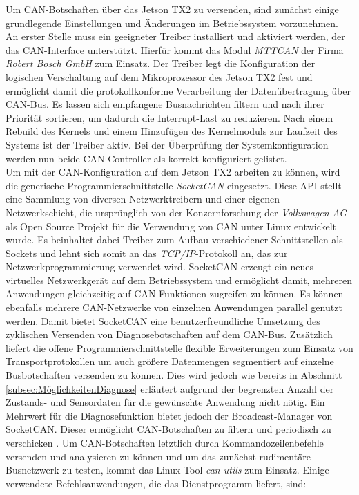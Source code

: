 Um CAN-Botschaften über das Jetson TX2 zu versenden, sind zunächst einige grundlegende Einstellungen und Änderungen im Betriebssystem vorzunehmen. An erster Stelle muss  ein geeigneter Treiber installiert und aktiviert werden, der das CAN-Interface unterstützt. Hierfür kommt das Modul \emph{MTTCAN} der Firma \emph{Robert Bosch GmbH} zum Einsatz. Der Treiber legt die Konfiguration der logischen Verschaltung auf dem Mikroprozessor des Jetson TX2 fest und ermöglicht damit die protokollkonforme Verarbeitung der Datenübertragung über CAN-Bus. Es lassen sich empfangene Busnachrichten filtern und nach ihrer Priorität sortieren, um dadurch die Interrupt-Last zu reduzieren. Nach einem Rebuild des Kernels und einem Hinzufügen des Kernelmoduls zur Laufzeit des Systems ist der Treiber aktiv. Bei der Überprüfung der Systemkonfiguration werden nun beide CAN-Controller als korrekt konfiguriert gelistet.\\
Um mit der CAN-Konfiguration auf dem Jetson TX2 arbeiten zu können, wird die generische Programmierschnittstelle \emph{SocketCAN} eingesetzt. Diese \acs{API} stellt eine Sammlung von diversen Netzwerktreibern und einer eigenen Netzwerkschicht, die ursprünglich von der Konzernforschung der \emph{Volkswagen AG} als Open Source Projekt für die Verwendung von CAN unter Linux entwickelt wurde. Es beinhaltet dabei Treiber zum Aufbau verschiedener Schnittstellen als Sockets und lehnt sich somit an das \emph{TCP/IP}-Protokoll an, das zur Netzwerkprogrammierung verwendet wird. SocketCAN erzeugt ein neues virtuelles Netzwerkgerät auf dem Betriebssystem und ermöglicht damit, mehreren Anwendungen gleichzeitig auf CAN-Funktionen zugreifen zu können. Es können ebenfalls mehrere CAN-Netzwerke von einzelnen Anwendungen parallel genutzt werden. Damit bietet SocketCAN eine benutzerfreundliche Umsetzung des zyklischen Versenden von Diagnosebotschaften auf dem CAN-Bus. Zusätzlich liefert die offene Programmierschnittstelle flexible Erweiterungen zum Einsatz von Transportprotokollen um auch größere Datenmengen segmentiert auf einzelne Busbotschaften versenden zu können. Dies wird jedoch wie bereits in Abschnitt \ref{subsec:MöglichkeitenDiagnose} erläutert aufgrund der begrenzten Anzahl der Zustands- und Sensordaten für die gewünschte Anwendung nicht nötig. Ein Mehrwert für die Diagnosefunktion bietet jedoch der Broadcast-Manager von SocketCAN. Dieser ermöglicht CAN-Botschaften zu filtern und periodisch zu verschicken \cite{OliverHartkopp.2017}.
Um CAN-Botschaften letztlich durch Kommandozeilenbefehle versenden und analysieren zu können und um das zunächst rudimentäre Busnetzwerk zu testen, kommt das Linux-Tool \emph{can-utils} zum Einsatz. Einige verwendete Befehlsanwendungen, die das Dienstprogramm liefert, sind:

